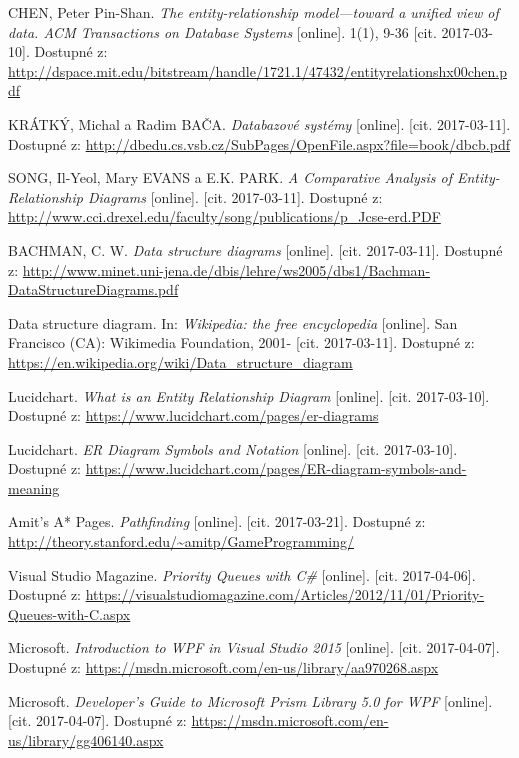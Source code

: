 \documentclass[czech,bachelor,public,dept460,male,oneside]{diploma}
\begin{document}
\newpage
\begin{thebibliography}{99}
	 CHEN, Peter Pin-Shan. \textit{The entity-relationship model---toward a unified view of data. ACM Transactions on Database Systems} [online]. 1(1), 9-36 [cit. 2017-03-10]. Dostupné z: \url{http://dspace.mit.edu/bitstream/handle/1721.1/47432/entityrelationshx00chen.pdf}
	
	 KRÁTKÝ, Michal a Radim BAČA. \textit{Databazové systémy} [online]. [cit. 2017-03-11]. Dostupné z: \url{http://dbedu.cs.vsb.cz/SubPages/OpenFile.aspx?file=book/dbcb.pdf}
	
	 SONG, Il-Yeol, Mary EVANS a E.K. PARK. \textit{A Comparative Analysis of Entity-Relationship Diagrams} [online]. [cit. 2017-03-11]. Dostupné z: \url{http://www.cci.drexel.edu/faculty/song/publications/p_Jcse-erd.PDF}
	
	 BACHMAN, C. W. \textit{Data structure diagrams} [online]. [cit. 2017-03-11]. Dostupné z: \url{http://www.minet.uni-jena.de/dbis/lehre/ws2005/dbs1/Bachman-DataStructureDiagrams.pdf}
	
	 Data structure diagram. In: \textit{Wikipedia: the free encyclopedia} [online]. San Francisco (CA): Wikimedia Foundation, 2001- [cit. 2017-03-11]. Dostupné z: \url{https://en.wikipedia.org/wiki/Data_structure_diagram}
	
	Lucidchart. \textit{What is an Entity Relationship Diagram} [online]. [cit. 2017-03-10]. Dostupné z: \url{https://www.lucidchart.com/pages/er-diagrams}
	
	Lucidchart. \textit{ER Diagram Symbols and Notation} [online]. [cit. 2017-03-10]. Dostupné z: \url{https://www.lucidchart.com/pages/ER-diagram-symbols-and-meaning}
	
	Amit’s A* Pages. \textit{Pathfinding} [online]. [cit. 2017-03-21]. Dostupné z: \url{http://theory.stanford.edu/~amitp/GameProgramming/}
	
	Visual Studio Magazine. \textit{Priority Queues with C\#} [online]. [cit. 2017-04-06]. Dostupné z: \url{https://visualstudiomagazine.com/Articles/2012/11/01/Priority-Queues-with-C.aspx}
	
	Microsoft. \textit{Introduction to WPF in Visual Studio 2015} [online]. [cit. 2017-04-07]. Dostupné z: \url{https://msdn.microsoft.com/en-us/library/aa970268.aspx}
	
	Microsoft. \textit{Developer's Guide to Microsoft Prism Library 5.0 for WPF} [online]. [cit. 2017-04-07]. Dostupné z: \url{https://msdn.microsoft.com/en-us/library/gg406140.aspx}
\end{thebibliography}
\end{document}
